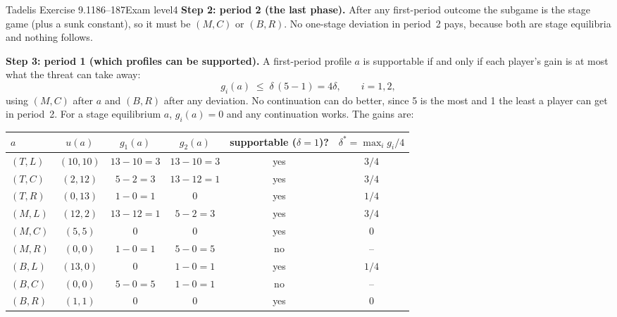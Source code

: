 \begin{exsol}{Tadelis Exercise 9.1}{186--187}{Exam level}{4}
\textbf{Step 2: period 2 (the last phase).} After any first-period outcome the subgame is the stage
game (plus a sunk constant), so it must be $(M,C)$ or $(B,R)$. No one-stage deviation in period~2
pays, because both are stage equilibria and nothing follows.

\textbf{Step 3: period 1 (which profiles can be supported).} A first-period profile $a$ is
supportable if and only if each player's gain is at most what the threat can take away:
\begin{equation}
  g_i(a) \;\le\; \delta\,(5 - 1) = 4\delta, \qquad i = 1, 2, \label{eq:tadelis-9-1-ic}
\end{equation}
using $(M,C)$ after $a$ and $(B,R)$ after any deviation. No continuation can do better, since 5 is
the most and 1 the least a player can get in period~2. For a stage equilibrium $a$, $g_i(a) = 0$
and any continuation works. The gains are:
\begin{center}
\small
\begin{tabular}{lccccc}
\toprule
$a$ & $u(a)$ & $g_1(a)$ & $g_2(a)$ & supportable ($\delta=1$)? & $\delta^* = \max_i g_i/4$\\
\midrule
$(T,L)$ & $(10,10)$ & $13-10=3$ & $13-10=3$ & yes & $3/4$ \\
$(T,C)$ & $(2,12)$ & $5-2=3$ & $13-12=1$ & yes & $3/4$ \\
$(T,R)$ & $(0,13)$ & $1-0=1$ & $0$ & yes & $1/4$ \\
$(M,L)$ & $(12,2)$ & $13-12=1$ & $5-2=3$ & yes & $3/4$ \\
$(M,C)$ & $(5,5)$ & $0$ & $0$ & yes & $0$ \\
$(M,R)$ & $(0,0)$ & $1-0=1$ & $5-0=5$ & no & -- \\
$(B,L)$ & $(13,0)$ & $0$ & $1-0=1$ & yes & $1/4$ \\
$(B,C)$ & $(0,0)$ & $5-0=5$ & $1-0=1$ & no & -- \\
$(B,R)$ & $(1,1)$ & $0$ & $0$ & yes & $0$ \\
\bottomrule
\end{tabular}
\end{center}


\end{exsol}
